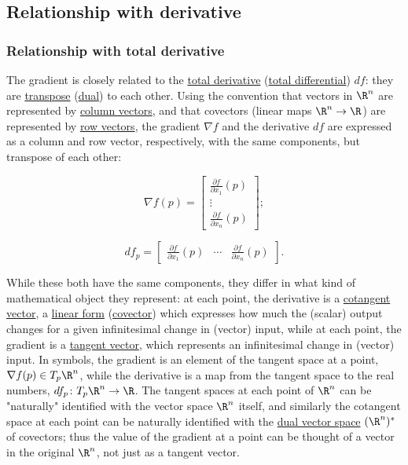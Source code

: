 \documentclass[
]{article}
\begin{document}
\hypertarget{relationship_with_derivative}{%
\subsection{Relationship with
derivative}\label{relationship_with_derivative}}

\hypertarget{relationship_with_total_derivative}{%
\subsubsection{Relationship with total
derivative}\label{relationship_with_total_derivative}}

The gradient is closely related to the \href{total_derivative}{total
derivative} (\href{total_differential}{total differential}) \(df\): they
are \url{transpose} (\href{Transpose_of_a_linear_map}{dual}) to each
other. Using the convention that vectors in \(\R^n\) are represented by
\href{column_vector}{column vectors}, and that covectors (linear maps
\(\R^n \to \R\)) are represented by \href{row_vector}{row vectors}, the
gradient \(\nabla f\) and the derivative \(df\) are expressed as a
column and row vector, respectively, with the same components, but
transpose of each other:

\[\nabla f(p) = \begin{bmatrix}\frac{\partial f}{\partial x_1}(p) \\ \vdots \\ \frac{\partial f}{\partial x_n}(p) \end{bmatrix} ;\]

\[df_p = \begin{bmatrix}\frac{\partial f}{\partial x_1}(p) & \cdots & \frac{\partial f}{\partial x_n}(p) \end{bmatrix} .\]

While these both have the same components, they differ in what kind of
mathematical object they represent: at each point, the derivative is a
\href{cotangent_vector}{cotangent vector}, a \href{linear_form}{linear
form} (\url{covector}) which expresses how much the (scalar) output
changes for a given infinitesimal change in (vector) input, while at
each point, the gradient is a \href{tangent_vector}{tangent vector},
which represents an infinitesimal change in (vector) input. In symbols,
the gradient is an element of the tangent space at a point,
\(\nabla f(p) \in T_p \R^n\), while the derivative is a map from the
tangent space to the real numbers, \(df_p \colon T_p \R^n \to \R\). The
tangent spaces at each point of \(\R^n\) can be "naturally" identified
with the vector space \(\R^n\) itself, and similarly the cotangent space
at each point can be naturally identified with the
\href{dual_vector_space}{dual vector space} \((\R^n)^*\) of covectors;
thus the value of the gradient at a point can be thought of a vector in
the original \(\R^n\), not just as a tangent vector.
\end{document}
